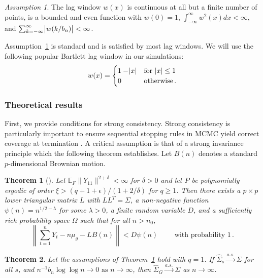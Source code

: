 \documentclass[11pt]{article}
\newcommand{\E}{\mathbb{E}}
\newtheorem{theorem}{Theorem}
\theoremstyle{remark}
\newtheorem{ass}{Assumption}
\begin{document}
\begin{ass}
\label{ass:lag_window}
The lag window $w(x)$ is continuous at all but a finite number of points, is a bounded and even function with $w(0)=1$, \; $\int_{-\infty}^{\infty}w^2(x)dx < \infty$, and $\sum_{k = -\infty}^{\infty} \abs{w(k/b_n)} < \infty$.
\end{ass}

Assumption~\ref{ass:lag_window} is standard \citep[see][]{ande:1971} and is satisfied by most lag windows. We will use the following popular Bartlett lag window in our simulations:
\[
w(x) = \begin{cases}
1 - \abs{x} & \textrm{for } \abs{x} \leq 1 \\
0 & \textrm{otherwise}\,.
\end{cases}
\]


\subsubsection{Theoretical results} \label{sec:G-SVE}

First, we provide conditions for strong consistency. Strong consistency is particularly important to ensure sequential stopping rules in MCMC yield correct coverage at termination \citep{fleg:gong:2015,glyn:whit:1992}. A critical assumption is that of a strong invariance principle which the following theorem establishes. Let $B(n)$ denotes a standard $p$-dimensional Brownian motion.


\begin{theorem}[\cite{kuel:1976,vats:fleg:jon:2018}]
  \label{thm:kuelbs}
Let $\E_F\|Y_{11}\|^{2+ \delta} < \infty$ for $\delta > 0$ and let $P$ be polynomially ergodic of order $\xi > (q + 1 + \epsilon)/(1 + 2/\delta)$ for $q \geq 1$. Then there exists a $p \times p$ lower triangular matrix $L$ with $LL^T = \Sigma$, a non-negative function $\psi(n) = n^{1/2 - \lambda}$ for some $\lambda > 0$, a finite random variable $D$, and a sufficiently rich probability space $\Omega$ such that for all $n > n_0$,
\[
\left\|\sum_{t=1}^{n}Y_t - n\mu_g - LB(n)\right\| < D\psi(n) \qquad \text{  with probability 1}\,.
\]
\end{theorem}


\begin{theorem}
\label{th:consistency}
 Let the assumptions of Theorem~\ref{thm:kuelbs} hold with $q = 1$. If $\hat{\Sigma}_{s} \xrightarrow{a.s.} \Sigma$ for all $s$, and $n^{-1}{b_n \log \log n} \to 0 \textrm{ as } n \to \infty$, then $\hat{\Sigma}_{G} \overset{a.s.}{\to} \Sigma$ as $n \to \infty$.
\end{theorem} 
\end{document}
